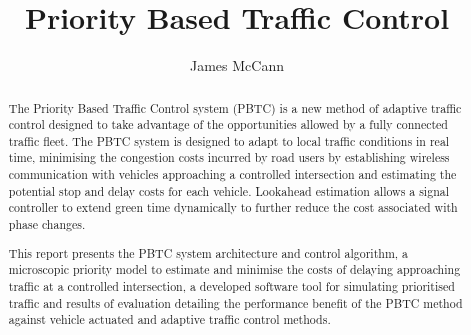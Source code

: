 \documentclass[11pt, a4paper, twoside, openright]{report}
\title{Priority Based Traffic Control}
\author{James McCann}
\date{}
\begin{document}
\frontmatter

\begin{abstract}

The Priority Based Traffic Control system (PBTC) is a new method of adaptive traffic control designed to take advantage of the opportunities allowed by a fully connected traffic fleet. The PBTC system is designed to adapt to local traffic conditions in real time, minimising the congestion costs incurred by road users by establishing wireless communication with vehicles approaching a controlled intersection and estimating the potential stop and delay costs for each vehicle. Lookahead estimation allows a signal controller to extend green time dynamically to further reduce the cost associated with phase changes. 

This report presents the PBTC system architecture and control algorithm, a microscopic priority model to estimate and minimise the costs of delaying approaching traffic at a controlled intersection, a developed software tool for simulating prioritised traffic and results of evaluation detailing the performance benefit of the PBTC method against vehicle actuated and adaptive traffic control methods.
  
\end{abstract}

\maketitle



\tableofcontents


\mainmatter








\backmatter

%





\end{document}
